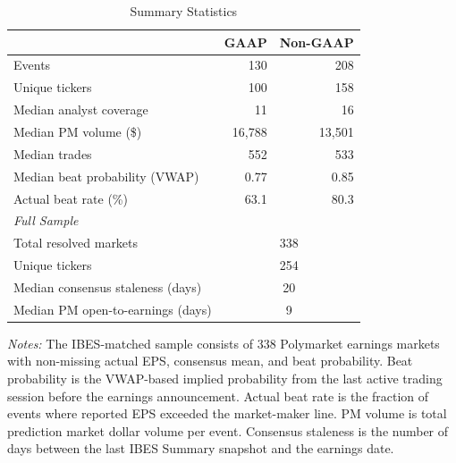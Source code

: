 \documentclass[11pt]{article}
\begin{document}
\begin{table}[htbp]
\centering
\begin{threeparttable}
\caption{Summary Statistics}
\label{tab:summary}
\begin{tabular}{lrr}
\toprule
& GAAP & Non-GAAP \\
\midrule
Events & 130 & 208 \\
Unique tickers & 100 & 158 \\
Median analyst coverage & 11 & 16 \\
Median PM volume (\$) & 16{,}788 & 13{,}501 \\
Median trades & 552 & 533 \\
Median beat probability (VWAP) & 0.77 & 0.85 \\
Actual beat rate (\%) & 63.1 & 80.3 \\
\midrule
\multicolumn{3}{l}{\textit{Full Sample}} \\
Total resolved markets & \multicolumn{2}{c}{338} \\
Unique tickers & \multicolumn{2}{c}{254} \\
Median consensus staleness (days) & \multicolumn{2}{c}{20} \\
Median PM open-to-earnings (days) & \multicolumn{2}{c}{9} \\
\bottomrule
\end{tabular}
\begin{tablenotes}
\small
\item \textit{Notes:} The IBES-matched sample consists of 338 Polymarket earnings markets with non-missing actual EPS, consensus mean, and beat probability. Beat probability is the VWAP-based implied probability from the last active trading session before the earnings announcement. Actual beat rate is the fraction of events where reported EPS exceeded the market-maker line. PM volume is total prediction market dollar volume per event. Consensus staleness is the number of days between the last IBES Summary snapshot and the earnings date.
\end{tablenotes}
\end{threeparttable}
\end{table}
\end{document}
